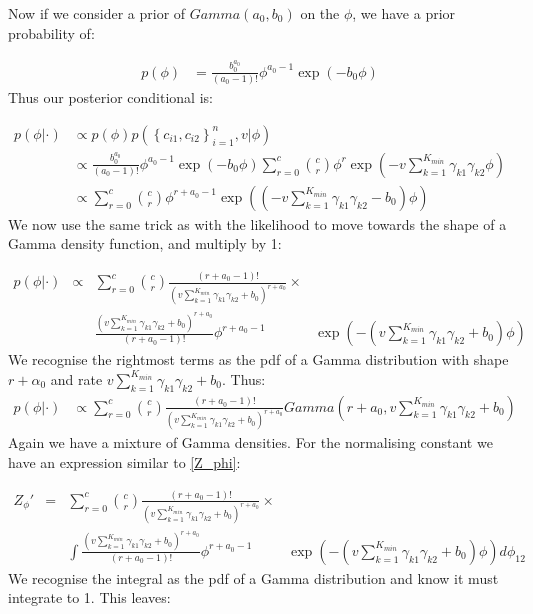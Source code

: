 \documentclass[11pt]{article} %
\begin{document}
Now if we consider a prior of $Gamma(a_0, b_0)$ on the $\phi$, we have a prior probability of:

\begin{align}
p(\phi) &= \frac{b_0^{a_0}}{(a_0 - 1)!}\phi^{a_0 - 1}\exp\left(-b_0 \phi \right)
\end{align}
Thus our posterior conditional is:


\begin{align}
p(\phi | \cdot) &\propto p(\phi) p(\left\{c_{i1}, c_{i2}\right\}_{i=1}^n, v | \phi)  \\
&\propto \frac{b_0^{a_0}}{(a_0 - 1)!}\phi^{a_0 - 1}\exp\left(-b_0 \phi \right)  \sum_{r=0}^c  \binom{c}{r}\phi^r \exp\left(-v \sum_{k=1}^{K_{min}} \gamma_{k1} \gamma_{k2}\phi\right) \\
&\propto \sum_{r=0}^c  \binom{c}{r} \phi^{r + a_0 - 1} \exp \left( \left(-v \sum_{k=1}^{K_{min}} \gamma_{k1} \gamma_{k2}  -b_0 \right)\phi\right)
\end{align}
We now use the same trick as with the likelihood to move towards the shape of a Gamma density function, and multiply by 1:

\begin{align}
\nonumber p(\phi | \cdot) &\propto & \sum_{r=0}^c  \binom{c}{r} \frac{(r + a_0 - 1)!}{ \left(v \sum_{k=1}^{K_{min}} \gamma_{k1} \gamma_{k2} + b_0 \right)^{r + a_0}} \times & \\
& &\frac{ \left(v \sum_{k=1}^{K_{min}} \gamma_{k1} \gamma_{k2} + b_0 \right)^{r + a_0}}{(r + a_0 - 1)!} \phi^{r + a_0 - 1} & \exp \left( - \left(v \sum_{k=1}^{K_{min}} \gamma_{k1} \gamma_{k2} + b_0 \right)\phi\right)
\end{align}
We recognise the rightmost terms as the pdf of a Gamma distribution with shape $r + \alpha_0$ and rate $v\sum_{k=1}^{K_{min}}\gamma_{k1}\gamma_{k2} + b_0$. Thus:
\begin{align}
p(\phi | \cdot) &\propto \sum_{r=0}^c  \binom{c}{r} \frac{(r + a_0 - 1)!}{ \left(v \sum_{k=1}^{K_{min}} \gamma_{k1} \gamma_{k2} + b_0 \right)^{r + a_0}} Gamma \left(r+ a_0, v \sum_{k=1}^{K_{min}} \gamma_{k1} \gamma_{k2} + b_0 \right)
\end{align}
Again we have a mixture of Gamma densities. For the normalising constant we have an expression similar to \eqref{Z_phi}:

\begin{align}
\nonumber Z_{\phi}' &=& \sum_{r=0}^c  \binom{c}{r} \frac{(r + a_0 - 1)!}{ \left(v \sum_{k=1}^{K_{min}} \gamma_{k1} \gamma_{k2} + b_0 \right)^{r + a_0}} \times & \\
&& \int \frac{ \left(v \sum_{k=1}^{K_{min}} \gamma_{k1} \gamma_{k2} + b_0 \right)^{r + a_0}}{(r + a_0 - 1)!} \phi^{r + a_0 - 1} & \exp \left( - \left(v \sum_{k=1}^{K_{min}} \gamma_{k1} \gamma_{k2} + b_0 \right)\phi\right) d\phi_{12}
\end{align}
We recognise the integral as the pdf of a Gamma distribution and know it must integrate to 1. This leaves:
\end{document}
